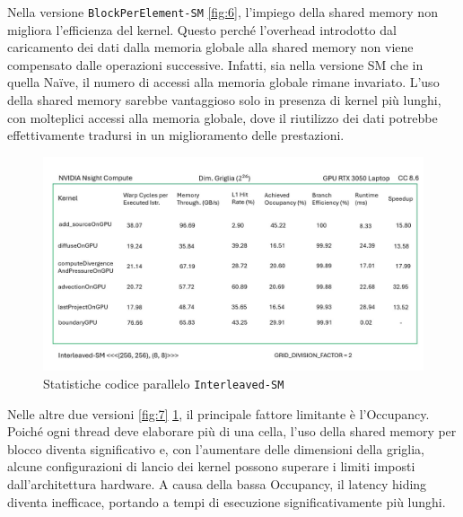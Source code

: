 \documentclass[12pt,a4paper,openany,twoside]{article}
\begin{document}
Nella versione \texttt{BlockPerElement-SM} \ref{fig:6}, l'impiego della shared memory non migliora l'efficienza del kernel. Questo perché l'overhead introdotto dal caricamento dei dati dalla memoria globale alla shared memory non viene compensato dalle operazioni successive. Infatti, sia nella versione SM che in quella Na{\"i}ve, il numero di accessi alla memoria globale rimane invariato. L'uso della shared memory sarebbe vantaggioso solo in presenza di kernel più lunghi, con molteplici accessi alla memoria globale, dove il riutilizzo dei dati potrebbe effettivamente tradursi in un miglioramento delle prestazioni.

\begin{figure}
    \centering
    \includegraphics[width=0.75\linewidth]{figures/Slide8.jpg}
    \caption{Statistiche codice parallelo \texttt{Interleaved-SM}}
    \label{fig:8}
\end{figure}

Nelle altre due versioni \ref{fig:7} \ref{fig:8}, il principale fattore limitante è l'Occupancy. Poiché ogni thread deve elaborare più di una cella, l'uso della shared memory per blocco diventa significativo e, con l'aumentare delle dimensioni della griglia, alcune configurazioni di lancio dei kernel possono superare i limiti imposti dall'architettura hardware. A causa della bassa Occupancy, il latency hiding diventa inefficace, portando a tempi di esecuzione significativamente più lunghi.
\end{document}
